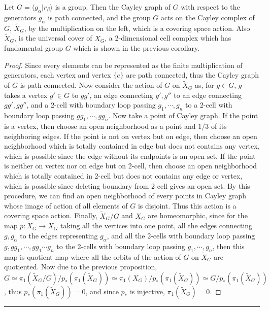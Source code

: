 \begin{prop} Let $G=\langle g_\alpha|r_\beta\rangle$ is a group. Then the Cayley graph of $G$ with respect to the generators $g_\alpha$ is path connected, and the group $G$ acts on the Cayley complex of $G$, $\tilde{X}_G$, by the multiplication on the left, which is a covering space action. Also $\tilde{X}_G$, is the universal cover of $X_G$, a 2-dimensional cell complex which has fundamental group $G$ which is shown in the previous corollary.
\end{prop}
\begin{proof}
Since every elements can be represented as the finite multiplication of generators, each vertex and vertex $\{e\}$ are path connected, thus the Cayley graph of $G$ is path connected. Now consider the action of $G$ on $\tilde{X}_G$ as, for $g\in G$, $g$ takes a vertex $g'\in G$ to $gg'$, an edge connecting $g',g''$ to an edge connecting $gg',gg''$, and a 2-cell with boundary loop passing $g_1,\cdots,g_n$ to a 2-cell with boundary loop passing $gg_1,\cdots,gg_n$. Now take a point of Cayley graph. If the point is a vertex, then choose an open neighborhood as a point and $1/3$ of its neighboring edges. If the point is not on vertex but on edge, then choose an open neighborhood which is totally contained in edge but does not contains any vertex, which is possible since the edge without its endpoints is an open set. If the point is neither on vertex nor on edge but on 2-cell, then choose an open neighborhood which is totally contained in 2-cell but does not contains any edge or vertex, which is possible since deleting boundary from 2-cell gives an open set. By this procedure, we can find an open neighborhood of every points in Cayley graph whose image of action of all elements of $G$ is disjoint.  Thus this action is a covering space action. Finally, $\tilde{X}_G/G$ and $X_G$ are homeomorphic, since for the map $p:\tilde{X}_G\rightarrow X_G$ taking all the vertices into one point, all the edges connecting $g,g_\alpha$ to the edges representing $g_\alpha$, and all the 2-cells with boundary loop passing $g,gg_1,\cdots,gg_1\cdots g_n$ to the 2-cells with boundary loop passing $g_1,\cdots,g_n$, then this map is quotient map where all the orbits of the action of $G$ on $\tilde{X}_G$ are quotiented. Now due to the previous proposition, $G\simeq \pi_1(\tilde{X}_G/G)/p_*(\pi_1(\tilde{X}_G))\simeq \pi_1(X_G)/p_*(\pi_1(\tilde{X}_G))\simeq G/p_*(\pi_1(\tilde{X}_G))$, thus $p_*(\pi_1(\tilde{X}_G))=0$, and since $p_*$ is injective, $\pi_1(\tilde{X}_G)=0$.
\end{proof}
\noindent\rule{\textwidth}{1pt}
\newline